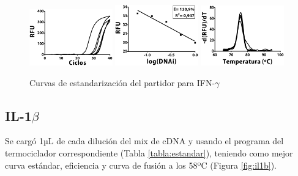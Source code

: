 \documentclass[12pt,letterpaper,oneside]{scrbook}
\begin{document}
\begin{figure}[h!]
\centering
        {\includegraphics[width=0.32\textwidth]{standarization/ifng/ampl}}
        {\includegraphics[width=0.32\textwidth]{standarization/ifng/stand}}
        {\includegraphics[width=0.32\textwidth]{standarization/ifng/melting}}
         \caption{Curvas de estandarización del partidor para IFN-$\gamma$}
         \label {fig:ifng}
    \end{figure}

\subsection{IL-1$\beta$}

Se cargó 1µL de cada dilución del mix de cDNA y usando el programa del
termociclador correspondiente (Tabla \ref{tabla:estandar}), teniendo
como mejor curva estándar, eficiencia y curva de fusión a los 58ºC
(Figura \ref{fig:il1b}).
\end{document}
